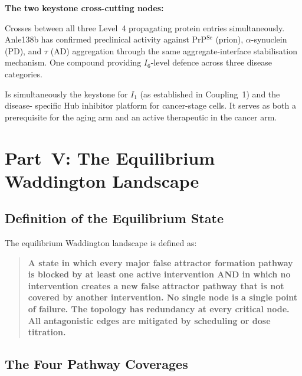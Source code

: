 \documentclass[12pt,a4paper]{article}
\newcommand{\prpsc}{PrP$^{\mathrm{Sc}}$}
\newcommand{\Inet}[1]{$I_{#1}$}
\begin{document}
\textbf{The two keystone cross-cutting nodes:}

\begin{description}[leftmargin=2em]
  \item[\textbf{\Inet{6} (anle138b):}] Crosses between all three Level~4
    propagating protein entries simultaneously. Anle138b has confirmed
    preclinical activity against \prpsc{} (prion), $\alpha$-synuclein
    (PD), and $\tau$ (AD) aggregation through the same aggregate-interface
    stabilisation mechanism. One compound providing \Inet{6}-level defence
    across three disease categories.

  \item[\textbf{\Inet{7} (cancer surveillance):}] Is simultaneously the
    keystone for \Inet{1} (as established in Coupling~1) and the disease-
    specific Hub inhibitor platform for cancer-stage cells. It serves as
    both a prerequisite for the aging arm and an active therapeutic in the
    cancer arm.
\end{description}

\section{Part~V: The Equilibrium Waddington Landscape}

\subsection{Definition of the Equilibrium State}

The equilibrium Waddington landscape is defined as:

\begin{quote}
\textbf{A state in which every major false attractor formation pathway is
blocked by at least one active intervention AND in which no intervention
creates a new false attractor pathway that is not covered by another
intervention. No single node is a single point of failure. The topology has
redundancy at every critical node. All antagonistic edges are mitigated by
scheduling or dose titration.}
\end{quote}

\subsection{The Four Pathway Coverages}
\end{document}
